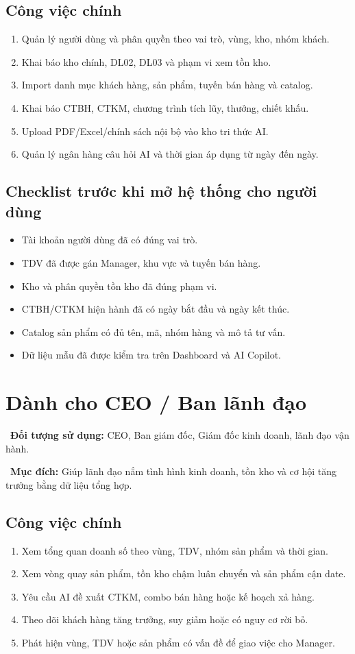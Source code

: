 \documentclass[12pt,a4paper,oneside,openany]{book}
\newcommand{\screenpurpose}[1]{\begin{tcolorbox}[colback=medgreen!8,colframe=medgreen!55,left=6pt,right=6pt,top=4pt,bottom=4pt]\faFlag\ \textbf{Mục đích:} #1\end{tcolorbox}}
\newcommand{\screenuser}[1]{\noindent\faUsers\ \textbf{Đối tượng sử dụng:} #1\par\smallskip}
\newcommand{\checkbox}{\makebox[1.2em][l]{$\square$}}
\begin{document}
\section{Công việc chính}
\begin{enumerate}
  \item Quản lý người dùng và phân quyền theo vai trò, vùng, kho, nhóm khách.
  \item Khai báo kho chính, DL02, DL03 và phạm vi xem tồn kho.
  \item Import danh mục khách hàng, sản phẩm, tuyến bán hàng và catalog.
  \item Khai báo CTBH, CTKM, chương trình tích lũy, thưởng, chiết khấu.
  \item Upload PDF/Excel/chính sách nội bộ vào kho tri thức AI.
  \item Quản lý ngân hàng câu hỏi AI và thời gian áp dụng từ ngày đến ngày.
\end{enumerate}

\section{Checklist trước khi mở hệ thống cho người dùng}
\begin{itemize}
  \item \checkbox Tài khoản người dùng đã có đúng vai trò.
  \item \checkbox TDV đã được gán Manager, khu vực và tuyến bán hàng.
  \item \checkbox Kho và phân quyền tồn kho đã đúng phạm vi.
  \item \checkbox CTBH/CTKM hiện hành đã có ngày bắt đầu và ngày kết thúc.
  \item \checkbox Catalog sản phẩm có đủ tên, mã, nhóm hàng và mô tả tư vấn.
  \item \checkbox Dữ liệu mẫu đã được kiểm tra trên Dashboard và AI Copilot.
\end{itemize}

\chapter{Dành cho CEO / Ban lãnh đạo}
\screenuser{CEO, Ban giám đốc, Giám đốc kinh doanh, lãnh đạo vận hành.}
\screenpurpose{Giúp lãnh đạo nắm tình hình kinh doanh, tồn kho và cơ hội tăng trưởng bằng dữ liệu tổng hợp.}

\section{Công việc chính}
\begin{enumerate}
  \item Xem tổng quan doanh số theo vùng, TDV, nhóm sản phẩm và thời gian.
  \item Xem vòng quay sản phẩm, tồn kho chậm luân chuyển và sản phẩm cận date.
  \item Yêu cầu AI đề xuất CTKM, combo bán hàng hoặc kế hoạch xả hàng.
  \item Theo dõi khách hàng tăng trưởng, suy giảm hoặc có nguy cơ rời bỏ.
  \item Phát hiện vùng, TDV hoặc sản phẩm có vấn đề để giao việc cho Manager.
\end{enumerate}
\end{document}
